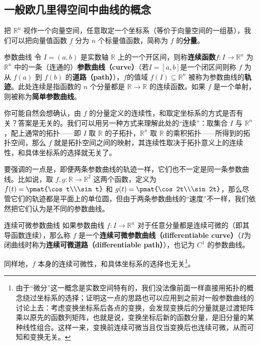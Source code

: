 


\subsection{一般欧几里得空间中曲线的概念}

把 $\mathbb{R}^n$ 视作一个向量空间，任意取定一个坐标系（等价于向量空间的一组基），我们可以把向量值函数 $f$ 分为 $n$ 个标量值函数，简称为 $f$ 的\textbf{分量}。

\begin{definition}{参数曲线}
令 $I = (a, b)$ 是实数轴 $\mathbb{R}$ 上的一个开区间，则称\textbf{连续函数}$f:I\to \mathbb{R}^n$ 为 $\mathbb{R}^n$ 中的一条（连通的）\textbf{参数曲线（curve）}（若$I = [a, b]$是一个闭区间则称 $f$ 为从 $f(a)$ 到 $f(b)$ 的\textbf{道路（path）}），$f$的值域 $f(I) \subseteq \mathbb{R}^n$ 被称为参数曲线的\textbf{轨迹}。此处连续是指函数的 $n$ 个分量都是 $\mathbb{R}\to\mathbb{R}$ 的连续函数。如果 $f$ 是一个单射，则被称为\textbf{简单参数曲线}。
\end{definition}

你可能自然会想确认，由 $f$ 的分量定义的连续性，和取定坐标系的方式是否有关？答案是无关的。我们可以用另一种方式来理解此处的“连续”：取集合 $I$ 与 $\mathbb{R}^n$，配上通常的拓扑——即 $I$ 取 $\mathbb{R}$ 的子拓扑，$\mathbb{R}^n$ 取 $\mathbb{R}$ 的乘积拓扑——所得到的拓扑空间，那么 $f$ 就是拓扑空间之间的映射，其连续性取决于拓扑意义上的连续性，和具体坐标系的选择就无关了。

要强调的一点是，即便两条参数曲线的轨迹一样，它们也不一定是同一条参数曲线。比如说，取 $f, g:\mathbb{R}\to\mathbb{R}^2$ 这两个函数，定义为 $f(t)=\pmat{\cos t\\\sin t}$ 和 $g(t)=\pmat{\cos 2t\\\sin 2t}$，那么尽管它们的轨迹都是平面上的单位圆，但由于两条参数曲线的“速度”不一样，我们依然把它们认为是不同的参数曲线。

\begin{definition}{连续可微参数曲线}
如果参数曲线 $f: I \to \mathbb{R}^n$ 对于任意分量都是连续可微的（即其导函数连续），那么称 $f$ 是一个\textbf{连续可微参数曲线（differentiable curve）}（$I$为闭曲线时称为\textbf{连续可微道路（differentiable path）}），也记为 $C^1$ 的参数曲线。
\end{definition}

同样地，$f$ 本身的连续可微性，和具体坐标系的选择也无关\footnote{由于“微分”这一概念是实数空间特有的，我们没法像前面一样直接用拓扑的概念绕过坐标系的选择；证明这一点的思路也可以应用到之前对一般参数曲线的讨论上去：考虑变换坐标系后各点的变换，会发现变换后的分量就是过渡矩阵乘以原先的函数列矩阵，也就是说，变换坐标后新的函数分量，是旧分量的某种线性组合。这样一来，变换前连续可微当且仅当变换后也连续可微，从而可知和变换无关。}。

